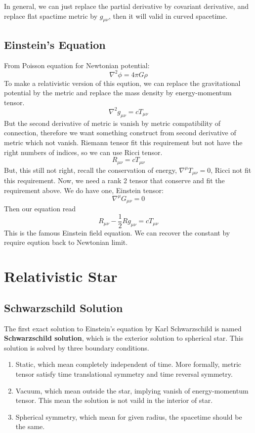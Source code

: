 \documentclass[12pt]{article}
\theoremstyle{mystyle}{\newtheorem{definition}{Definition}[section]}
\theoremstyle{mystyle}{\newtheorem{theorem}[definition]{Theorem}}
\theoremstyle{mystyle}{\newtheorem*{remark}{Remark}}
\theoremstyle{mystyle}{\newtheorem*{example}{Example}}
\theoremstyle{mystyle}{\newtheorem*{examples}{Examples}}
\theoremstyle{cstyle}{\newtheorem*{cthm}{}}
\begin{document}
In general, we can just replace the partial derivative by covariant derivative, and replace flat spactime metric by \(g_{\mu\nu}\), 
then it will valid in curved spacetime.



\subsection{Einstein's Equation}
From Poisson equation for Newtonian potential:
\[\nabla^2 \phi = 4 \pi G \rho\]
To make a relativistic version of this eqution, we can replace the gravitational potential by the metric and replace the mass density by energy-momentum tensor.
\[\nabla^2 g_{\mu\nu} = c T_{\mu\nu}\]
But the second derivative of metric is vanish by metric compatibility of connection, therefore we want something construct from second derivative of metric which not vanish.
Riemann tensor fit this requirement but not have the right numbers of indices, so we can use Ricci tensor. 
\[R_{\mu\nu} = c T_{\mu\nu}\]
But, this still not right, recall the conservation of energy, \(\nabla^{\mu}T_{\mu\nu} = 0\), Ricci not fit this requirement. 
Now, we need a rank 2 tensor that conserve and fit the requirement above. We do have one, Einstein tensor:
\[\nabla^{\mu}G_{\mu\nu} = 0\]
Then our equation read \[R_{\mu\nu} -\frac{1}{2}Rg_{\mu\nu} = cT_{\mu\nu}\]
This is the famous Einstein field equation. We can recover the constant by require eqution back to Newtonian limit.
\section{Relativistic Star}

\subsection{Schwarzschild Solution}

The first exact solution to Einstein's equation by Karl Schwarzschild is named \textbf{Schwarzschild solution}, 
which is the exterior solution to spherical star.
This solution is solved by three boundary conditions.

\begin{enumerate}
  \item Static, which mean completely independent of time. More formally, metric tensor satisfy time translational symmetry and time reversal symmetry.
  \item Vacuum, which mean outside the star, implying vanish of energy-momentum tensor. This mean the solution is not vaild in the interior of star.
  \item Spherical symmetry, which mean for given radius, the spacetime should be the same.
\end{enumerate}
\end{document}

